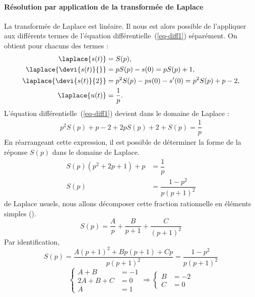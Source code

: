 \paragraph{Résolution par application de la transformée de Laplace}
La transformée de Laplace est linéaire. Il nous est alors possible
de l'appliquer aux différents termes de l'équation 
différentielle~(\ref{eq-diff1}) séparément.
On obtient pour chacuns des termes :
\begin{align*}
    \laplace{s(t)} &= S(p), \\
    \laplace{\devi{s(t)}{}} &= pS(p)-s(0) = pS(p) +1, \\
    \laplace{\devi{s(t)}{2}} &= p^2S(p)-ps(0)-s'(0) = p^2S(p) + p -2,\\
    \laplace{u(t)} &= \dfrac{1}{p}.
\end{align*}
\newpage
\restoregeometry
\captionsetup{width=0.9\linewidth}
L'équation différentielle~(\ref{eq-diff1}) devient dans le domaine 
de Laplace :
\begin{align*}
p^2S(p)+p-2+2pS(p)+2+S(p)=\dfrac{1}{p} 
\end{align*}
En réarrangeant cette expression, il est possible de déterminer la 
forme de la réponse $S(p)$ dans le domaine de Laplace.
\begin{align*}
    S(p)\left(p^2+2p+1\right)+p&=\dfrac{1}{p} \\
    S(p)&= \dfrac{1-p^2}{p\left(p+1\right)^2}
\end{align*}
de Laplace usuels, nous allons décomposer cette
fraction rationnelle en éléments simples ().
\[
    S(p)=\dfrac{A}{p}+\dfrac{B}{p+1}+\dfrac{C}{(p+1)^2}
\]
Par identification, 
\[
    S(p)=\dfrac{A(p+1)^2+Bp(p+1)+Cp}{p(p+1)^2}
        =\dfrac{1-p^2}{p\left(p+1\right)^2}
\]
\[
\begin{cases}
    A+B&=-1 \\
    2A+B+C&=0 \\
    A&=1   
\end{cases}\Rightarrow
\begin{cases}
    B&=-2\\
    C&=0
\end{cases}
\]
